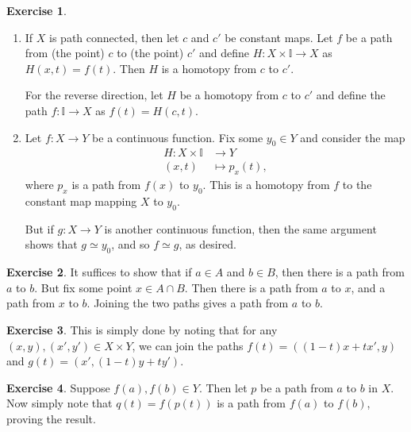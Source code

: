 \documentclass[10pt]{article}
\theoremstyle{definition}
\newtheorem{intex}{Exercise}[section]
\newenvironment{exercise}{\begin{intex}\label{\theintex}}{\end{intex}}
\newcommand*\II{\mathbb I}
\begin{document}
\begin{exercise} \leavevmode
\begin{enumerate}
\item If $X$ is path connected, then let $c$ and $c'$ be constant maps. Let $f$ be a path from (the point) $c$ to (the point) $c'$ and define $H:X\times\II\to X$ as $H(x,t)=f(t)$. Then $H$ is a homotopy from $c$ to $c'$. 

For the reverse direction, let $H$ be a homotopy from $c$ to $c'$ and define the path $f:\II\to X$ as $f(t)=H(c,t)$. 

\item Let $f:X\to Y$ be a continuous function. Fix some $y_0\in Y$ and consider the map \begin{align*}H:X\times\II&\to Y\\(x,t)&\mapsto p_x(t),\end{align*} where $p_x$ is a path from $f(x)$ to $y_0$. This is a homotopy from $f$ to the constant map mapping $X$ to $y_0$. 

But if $g:X\to Y$ is another continuous function, then the same argument shows that $g\simeq y_0$, and so $f\simeq g$, as desired. 
\end{enumerate} 
\end{exercise} 

\begin{exercise} \leavevmode
It suffices to show that if $a\in A$ and $b\in B$, then there is a path from $a$ to $b$. But fix some point $x\in A\cap B$. Then there is a path from $a$ to $x$, and a path from $x$ to $b$. Joining the two paths gives a path from $a$ to $b$. 
\end{exercise} 

\begin{exercise} \leavevmode
This is simply done by noting that for any $(x,y),(x',y')\in X\times Y$, we can join the paths $f(t)=((1-t)x+tx',y)$ and $g(t)=(x',(1-t)y+ty')$. 
\end{exercise} 

\begin{exercise} \leavevmode
Suppose $f(a),f(b)\in Y$. Then let $p$ be a path from $a$ to $b$ in $X$. Now simply note that $q(t)=f(p(t))$ is a path from $f(a)$ to $f(b)$, proving the result. 
\end{exercise} 
\end{document}
